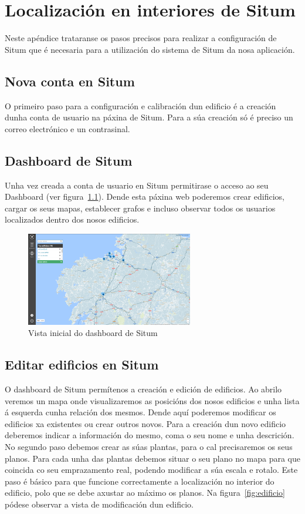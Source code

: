 \chapter{Localización en interiores de Situm}
Neste apéndice trataranse os pasos precisos para realizar a configuración de Situm que é necesaria para a utilización do sistema de Situm da nosa aplicación.

\section{Nova conta en Situm}
O primeiro paso para a configuración e calibración dun edificio é a creación dunha conta de usuario na páxina de Situm. Para a súa creación só é preciso un correo electrónico e un contrasinal.

\section{Dashboard de Situm}
Unha vez creada a conta de usuario en Situm permitirase o acceso ao seu Dashboard (ver figura~\ref{fig:dashboard}). Dende esta páxina web poderemos crear edificios, cargar os seus mapas, establecer grafos e incluso observar todos os usuarios localizados dentro dos nosos edificios.

\begin{figure}[tb] 
	\begin{center}
		\includegraphics[width=0.65\textwidth]{figures/Capturas/dashboard}
		\caption{Vista inicial do dashboard de Situm}
		\label{fig:dashboard}
	\end{center}
\end{figure}

\section{Editar edificios en Situm}
O dashboard de Situm permítenos a creación e edición de edificios. Ao abrilo veremos un mapa onde visualizaremos as posicións dos nosos edificios e unha lista á esquerda cunha relación dos mesmos. Dende aquí poderemos modificar os edificios xa existentes ou crear outros novos.
Para a creación dun novo edificio deberemos indicar a información do mesmo, coma o seu nome e unha descrición. No segundo paso debemos crear as súas plantas, para o cal precisaremos os seus planos. Para cada unha das plantas debemos situar o seu plano no mapa para que coincida co seu emprazamento real, podendo modificar a súa escala e rotalo. Este paso é básico para que funcione correctamente a localización no interior do edificio, polo que se debe axustar ao máximo os planos.
Na figura~\ref{fig:edificio} pódese observar a vista de modificación dun edificio.

